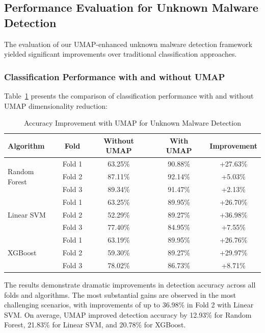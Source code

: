 \subsection{Performance Evaluation for Unknown Malware Detection}
\label{subsec:umap-performance}

The evaluation of our UMAP-enhanced unknown malware detection framework yielded significant improvements over traditional classification approaches.

\subsubsection{Classification Performance with and without UMAP}

Table~\ref{tab:umap-improvement} presents the comparison of classification performance with and without UMAP dimensionality reduction:

\begin{table}[!htbp]
    \centering
    \caption{Accuracy Improvement with UMAP for Unknown Malware Detection}
    \label{tab:umap-improvement}
    \begin{tabular}{|l|c|c|c|c|}
    \hline
    \textbf{Algorithm} & \textbf{Fold} & \textbf{Without UMAP} & \textbf{With UMAP} & \textbf{Improvement} \\
    \hline
    \multirow{3}{*}{Random Forest} & Fold 1 & 63.25\% & 90.88\% & +27.63\% \\
    & Fold 2 & 87.11\% & 92.14\% & +5.03\% \\
    & Fold 3 & 89.34\% & 91.47\% & +2.13\% \\
    \hline
    \multirow{3}{*}{Linear SVM} & Fold 1 & 63.25\% & 89.95\% & +26.70\% \\
    & Fold 2 & 52.29\% & 89.27\% & +36.98\% \\
    & Fold 3 & 77.40\% & 84.95\% & +7.55\% \\
    \hline
    \multirow{3}{*}{XGBoost} & Fold 1 & 63.19\% & 89.95\% & +26.76\% \\
    & Fold 2 & 59.30\% & 89.27\% & +29.97\% \\
    & Fold 3 & 78.02\% & 86.73\% & +8.71\% \\
    \hline
    \end{tabular}
\end{table}

The results demonstrate dramatic improvements in detection accuracy across all folds and algorithms. The most substantial gains are observed in the most challenging scenarios, with improvements of up to 36.98\% in Fold 2 with Linear SVM. On average, UMAP improved detection accuracy by 12.93\% for Random Forest, 21.83\% for Linear SVM, and 20.78\% for XGBoost.

